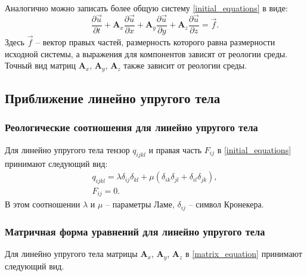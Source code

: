 Аналогично можно записать более общую систему \ref{initial_equations} в виде:
\begin{equation}
\label{matrix_equation}
\frac{\partial\vec{u}}{\partial{t}}+\mathbf{A}_x\frac{\partial\vec{u}}{\partial{x}}+
\mathbf{A}_y\frac{\partial\vec{u}}{\partial{y}}+
\mathbf{A}_z\frac{\partial\vec{u}}{\partial{z}}=\vec{f}.
\end{equation}
Здесь $\vec{f}$ -- вектор правых частей, размерность которого равна размерности исходной системы, а выражения для компонентов зависят от реологии среды. Точный вид матриц $\mathbf{A}_x$, $\mathbf{A}_y$, $\mathbf{A}_z$ также зависит от реологии среды.

\clearpage
\newpage

\subsection{Приближение линейно упругого тела}

\subsubsection{Реологические соотношения для линейно упругого тела}

Для линейно упругого тела тензор $q_{ijkl}$ и правая часть $F_{ij}$ в \ref{initial_equations} принимают следующий вид:
\begin{eqnarray}
\label{tensor_qijkl_elastic}
q_{ijkl}=\lambda\delta_{ij}\delta_{kl}+\mu(\delta_{ik}\delta_{jl}+\delta_{il}
\delta_{jk}),\nonumber\\
F_{ij}=0.
\end{eqnarray}
В этом соотношении $\lambda$ и $\mu$ -- параметры Ламе, $\delta_{ij}$ -- символ Кронекера.

\subsubsection{Матричная форма уравнений для линейно упругого тела}
\label{elastic_matrixes}

Для линейно упругого тела матрицы $\mathbf{A}_x$, $\mathbf{A}_y$, $\mathbf{A}_z$ в \ref{matrix_equation} принимают следующий вид.

